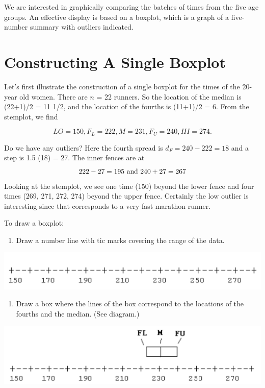 \documentclass[
]{book}
\providecommand{\tightlist}{%
  \setlength{\itemsep}{0pt}\setlength{\parskip}{0pt}}
\begin{document}
We are interested in graphically comparing the batches of times from the five age groups. An effective display is based on a boxplot, which is a graph of a five-number summary with outliers indicated.

\hypertarget{constructing-a-single-boxplot}{%
\section{Constructing A Single Boxplot}\label{constructing-a-single-boxplot}}

Let's first illustrate the construction of a single boxplot for the times of the 20-year old women. There are \(n\) = 22 runners. So the location of the median is (22+1)/2 = 11 1/2, and the location of the fourths is (11+1)/2 = 6. From the stemplot, we find

\[
LO = 150,  F_L = 222,  M = 231,  F_U = 240, HI = 274 .
\]

Do we have any outliers? Here the fourth spread is \(d_F = 240 - 222 = 18\) and a step is 1.5 (18) = 27. The inner fences are at
\[
222 - 27 = 195 \,\, {\rm and} \,\, 240 + 27 = 267
\]
Looking at the stemplot, we see one time (150) beyond the lower fence and four times (269, 271, 272, 274) beyond the upper fence. Certainly the low outlier is interesting since that corresponds to a very fast marathon runner.

To draw a boxplot:

\begin{enumerate}
\def\labelenumi{\arabic{enumi}.}
\tightlist
\item
  Draw a number line with tic marks covering the range of the data.
\end{enumerate}

\includegraphics[width=0.8\linewidth]{figures/comparison/boxplot1}

\begin{enumerate}
\def\labelenumi{\arabic{enumi}.}
\setcounter{enumi}{1}
\tightlist
\item
  Draw a box where the lines of the box correspond to the locations of the fourths and the median. (See diagram.)
\end{enumerate}

\includegraphics[width=0.8\linewidth]{figures/comparison/boxplot2}
\end{document}
